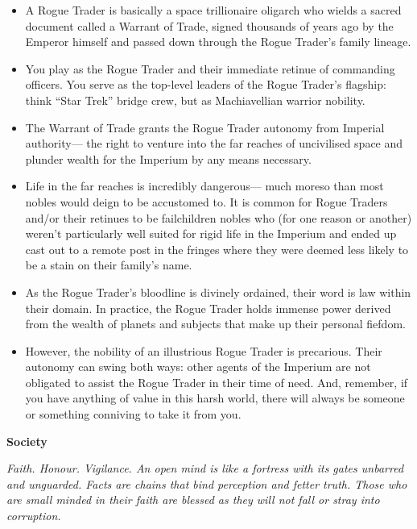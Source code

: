 \documentclass[10pt,a4paper]{article}
\newcommand{\rpgsection}[1]{%
  \vspace{0.8em}%
  {\headerfont\bfseries\Large #1}\par%
  \vspace{0.5em}%
}
\begin{document}
\begin{multicols}{2}
\begin{itemize}
  \item A Rogue Trader is basically a space trillionaire oligarch who wields a sacred document called a Warrant of Trade, signed thousands of years ago by the Emperor himself and passed down through the Rogue Trader's family lineage. 
  \item You play as the Rogue Trader and their immediate retinue of commanding officers. You serve as the top-level leaders of the Rogue Trader's flagship: think “Star Trek” bridge crew, but as Machiavellian warrior nobility. 
  \item The Warrant of Trade grants the Rogue Trader autonomy from Imperial authority— the right to venture into the far reaches of uncivilised space and plunder wealth for the Imperium by any means necessary.
  \item Life in the far reaches is incredibly dangerous— much moreso than most nobles would deign to be accustomed to. It is common for Rogue Traders and/or their retinues to be failchildren nobles who (for one reason or another) weren't particularly well suited for rigid life in the Imperium and ended up cast out to a remote post in the fringes where they were deemed less likely to be a stain on their family's name.
  \item As the Rogue Trader’s bloodline is divinely ordained, their word is law within their domain. In practice, the Rogue Trader holds immense power derived from the wealth of planets and subjects that make up their personal fiefdom.
  \item However, the nobility of an illustrious Rogue Trader is precarious. Their autonomy can swing both ways: other agents of the Imperium are not obligated to assist the Rogue Trader in their time of need. And, remember, if you have anything of value in this harsh world, there will always be someone or something conniving to take it from you.
\end{itemize}

\rpgsection{Society}
\textit{Faith. Honour. Vigilance. An open mind is like a fortress with its gates unbarred and unguarded. Facts are chains that bind perception and fetter truth. Those who are small minded in their faith are blessed as they will not fall or stray into corruption.}


\end{multicols}
\end{document}
